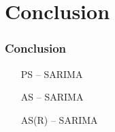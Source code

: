 \documentclass{beamer}
\begin{document}
\section{Conclusion}


\begin{frame}
  \frametitle{Conclusion}

  \begin{itemize}
    \item [PS] – SARIMA
    \item [AS] – SARIMA
    \item [AS(R)] – SARIMA
  \end{itemize}
\end{frame}
\end{document}
